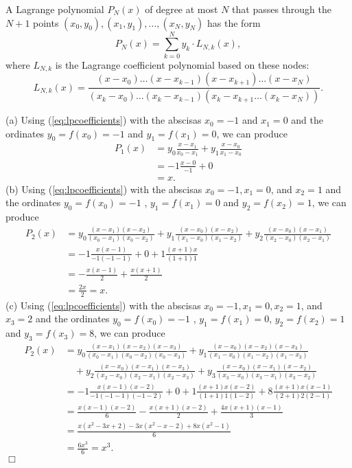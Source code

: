 \documentclass[UTF8,12pt,hyperref]{ctexart}
\newenvironment{solve}[1][\color{blue}\bf Solve]{\begin{trivlist}
\item[\hskip \labelsep {\color{blue}\bfseries
#1}]}{\hfill$\Box$\end{trivlist}}
\begin{document}
\begin{solve}
  A Lagrange polynomial $P_N(x)$ of degree at most $N$ that passes through 
  the $N+1$ points $(x_0,y_0),(x_1,y_1),\dots,(x_N,y_N)$ has the form
  \begin{equation}
    P_N(x) = \sum\limits_{k=0}^{N} y_k\cdot L_{N,k}(x),
  \end{equation} 
  where $L_{N,k}$ is the Lagrange coefficient polynomial based on these nodes:
  \begin{equation}
    L_{N,k}(x)=\frac{(x-x_0)\dots(x-x_{k-1})(x-x_{k+1})\dots(x-x_N)}{(x_k-x_0)\dots(x_k-x_{k-1})(x_k-x_{k+1}\dots(x_k-x_N))}.
    \label{eq:lpcoefficients}
  \end{equation}

  (a) Using (\ref{eq:lpcoefficients}) with the abscisas $x_0=-1$ and $x_1=0$
  and the ordinates $y_0=f(x_0)=-1$ and $y_1=f(x_1)=0$,
  we can produce 
  \begin{align*}
    P_1(x) &= y_0\frac{x-x_1}{x_0-x_1} + y_1\frac{x-x_0}{x_1-x_0}\\
          &= -1\frac{x-0}{-1}+0\\
          &= x.
  \end{align*}
  (b) Using (\ref{eq:lpcoefficients}) with the abscisas $x_0 = - 1, x_1=0$, and $x_2=1$
  and the ordinates $y_0=f(x_0)=-1$ , $y_1=f(x_1)=0$ and $y_2=f(x_2)=1$,
  we can produce 
  \begin{align*}
    P_2(x) &= y_0\frac{(x-x_1)(x-x_2)}{(x_0-x_1)(x_0-x_2)} + y_1\frac{(x-x_0)(x-x_2)}{(x_1-x_0)(x_1-x_2)}+y_2\frac{(x-x_0)(x-x_1)}{(x_2-x_0)(x_2-x_1)}\\
          &= -1\frac{x(x-1)}{-1(-1-1)} + 0 + 1\frac{(x+1)x}{(1+1)1}\\
          &= -\frac{x(x-1)}{2} + \frac{x(x+1)}{2}\\
          &= \frac{2x}{2} = x.
  \end{align*}
  (c) Using (\ref{eq:lpcoefficients}) with the abscisas $x_0 = - 1, x_1=0, x_2=1$, and $x_3=2$
  and the ordinates $y_0=f(x_0)=-1$ , $y_1=f(x_1)=0$, $y_2=f(x_2)=1$ and $y_3=f(x_3)=8$,
  we can produce 
  \begin{align*}
    P_2(x) &= y_0\frac{(x-x_1)(x-x_2)(x-x_3)}{(x_0-x_1)(x_0-x_2)(x_0-x_3)} 
    +y_1\frac{(x-x_0)(x-x_2)(x-x_3)}{(x_1-x_0)(x_1-x_2)(x_1-x_3)}\\
    &\quad +y_2\frac{(x-x_0)(x-x_1)(x-x_3)}{(x_2-x_0)(x_2-x_1)(x_2-x_3)}
    +y_3\frac{(x-x_0)(x-x_1)(x-x_2)}{(x_3-x_0)(x_3-x_1)(x_3-x_2)}\\
          &= -1\frac{x(x-1)(x-2)}{-1(-1-1)(-1-2)} + 0 + 1\frac{(x+1)x(x-2)}{(1+1)1(1-2)} + 8\frac{(x+1)x(x-1)}{(2+1)2(2-1)}\\
          &= \frac{x(x-1)(x-2)}{6}-\frac{x(x+1)(x-2)}{2}+\frac{4x(x+1)(x-1)}{3}\\
          &= \frac{x(x^2-3x+2)-3x(x^2-x-2)+8x(x^2-1)}{6}\\
          &= \frac{6x^3}{6}= x^3.
  \end{align*}
\end{solve}
  
\end{document}
